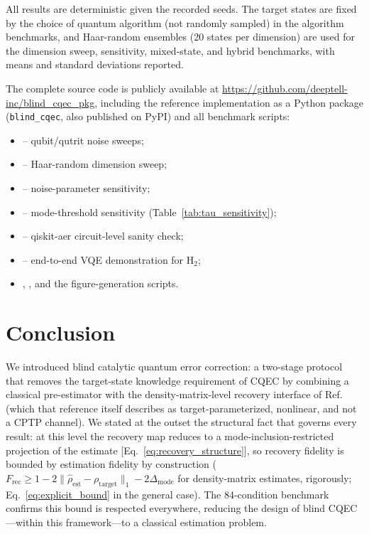 \documentclass[12pt,a4paper]{article}
\newcommand{\Frec}{F_\mathrm{rec}}
\newcommand{\rhot}{\rho_\mathrm{target}}
\newcommand{\rhoe}{\hat{\rho}_\mathrm{est}}
\begin{document}
All results are deterministic given the recorded seeds.
The target states are fixed by the choice of quantum algorithm (not randomly sampled) in the algorithm benchmarks, and Haar-random ensembles (20 states per dimension) are used for the dimension sweep, sensitivity, mixed-state, and hybrid benchmarks, with means and standard deviations reported.

The complete source code is publicly available at \url{https://github.com/deeptell-inc/blind_cqec_pkg}, including the reference implementation as a Python package (\texttt{blind\_cqec}, also published on PyPI) and all benchmark scripts:
\begin{itemize}\setlength{\itemsep}{0pt}\setlength{\parsep}{0pt}
  \item {} -- qubit/qutrit noise sweeps;
  \item {} -- Haar-random dimension sweep;
  \item {} -- noise-parameter sensitivity;
  \item {} -- mode-threshold sensitivity (Table~\ref{tab:tau_sensitivity});
  \item {} -- qiskit-aer circuit-level sanity check;
  \item {} -- end-to-end VQE demonstration for H$_2$;
  \item {}, , and the figure-generation scripts.
\end{itemize} 

      
\section{Conclusion}
\label{sec:conclusion}

We introduced blind catalytic quantum error correction: a two-stage protocol that removes the target-state knowledge requirement of CQEC by combining a classical pre-estimator with the density-matrix-level recovery interface of Ref.~\cite{Wakaura2026unified} (which that reference itself describes as target-parameterized, nonlinear, and not a CPTP channel).
We stated at the outset the structural fact that governs every result: at this level the recovery map reduces to a mode-inclusion-restricted projection of the estimate [Eq.~\eqref{eq:recovery_structure}], so recovery fidelity is bounded by estimation fidelity by construction ($\Frec \geq 1 - 2\|\rhoe - \rhot\|_1 - 2\Delta_\mathrm{mode}$ for density-matrix estimates, rigorously; Eq.~\eqref{eq:explicit_bound} in the general case).
The 84-condition benchmark confirms this bound is respected everywhere, reducing the design of blind CQEC---within this framework---to a classical estimation problem.
\end{document}
